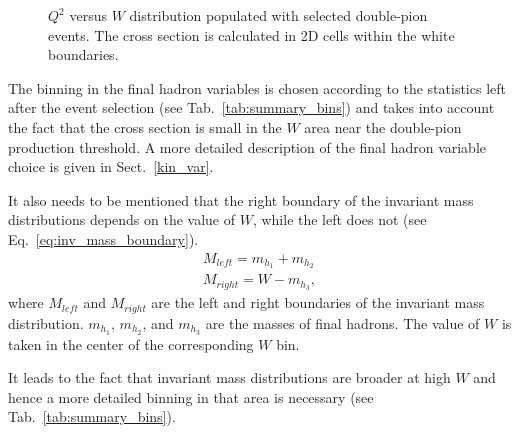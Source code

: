 \begin{figure}[htp]
\begin{center}
\caption{\small $Q^2$ versus $W$ distribution populated with selected double-pion events. The cross section is calculated in 2D cells within the white boundaries.  \label{fig:summary_q2vsw}}
\end{center}
\end{figure}

The binning in the final hadron variables is chosen according to the statistics left after the event selection (see Tab.~\ref{tab:summary_bins}) and takes into account the fact that the cross section is small in the $W$ area near the double-pion production threshold. A more detailed description of the final hadron variable choice is given in Sect.~\ref{kin_var}.

It also needs to be mentioned that the right boundary of the invariant mass distributions depends on the value of $W$, while the left does not (see Eq.~\ref{eq:inv_mass_boundary}). 
\begin{equation}
\begin{aligned}
M_{left} = m_{h_1} + m_{h_2} \\
M_{right} = W - m_{h_3}, \label{eq:inv_mass_boundary}
\end{aligned}  
\end{equation}
where $M_{left}$ and $M_{right}$ are the left and right boundaries of  the invariant mass distribution. $m_{h_1}$, $m_{h_2}$, and $m_{h_3}$ are the masses of final hadrons. The value of $W$ is taken in the center of the corresponding $W$ bin.

It leads to the fact that invariant mass distributions are broader at high $W$ and hence a more detailed binning in that area is necessary (see Tab.~\ref{tab:summary_bins}).

